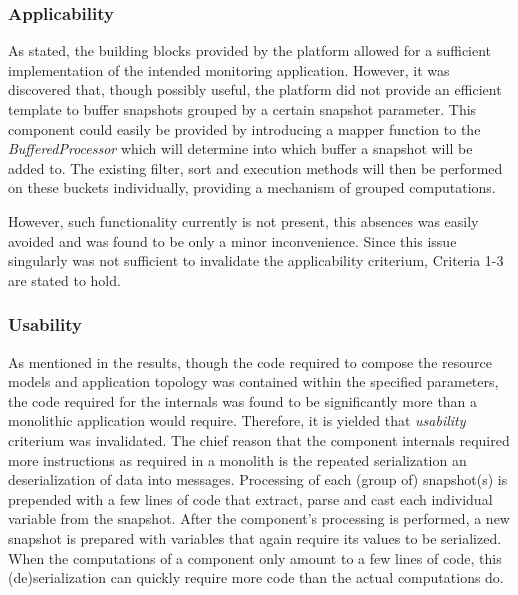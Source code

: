 \subsubsection{Applicability}
As stated, the building blocks provided by the platform allowed for a sufficient implementation of the intended monitoring application. However, it was discovered that, though possibly useful, the platform did not provide an efficient template to buffer snapshots grouped by a certain snapshot parameter.  This component could easily be provided by introducing a mapper function to the \emph{BufferedProcessor} which will determine into which buffer a snapshot will be added to. The existing filter, sort and execution methods will then be performed on these buckets individually, providing a mechanism of grouped computations.

However, such functionality currently is not present, this absences was easily avoided and was found to be only a minor inconvenience. Since this issue singularly was not sufficient to invalidate the applicability criterium, Criteria 1-3 are stated to hold.


\subsubsection{Usability}
As mentioned in the results, though the code required to compose the resource models and application topology was contained within the specified parameters, the code required for the internals was found to be significantly more than a monolithic application would require. Therefore, it is yielded that \emph{usability} criterium was invalidated. The chief reason that the component internals required  more instructions as required in a monolith is the repeated serialization an deserialization of data into messages. Processing of each (group of) snapshot(s) is prepended with a few lines of code that extract, parse and cast each individual variable from the snapshot. After the component's processing is performed, a new snapshot is prepared with variables that again require its values to be serialized. When the computations of a component only amount to a few lines of code, this (de)serialization can quickly require more code than the actual computations do.

